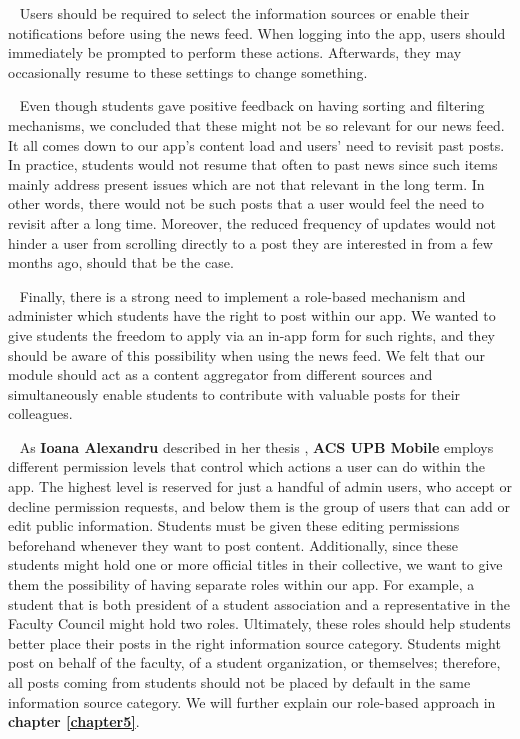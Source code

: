 ~
Users should be required to select the information sources or enable their notifications before using the news feed. When logging into the app, users should immediately be prompted to perform these actions. Afterwards, they may occasionally resume to these settings to change something.

~
Even though students gave positive feedback on having sorting and filtering mechanisms, we concluded that these might not be so relevant for our news feed. It all comes down to our app's content load and users' need to revisit past posts. In practice, students would not resume that often to past news since such items mainly address present issues which are not that relevant in the long term. In other words, there would not be such posts that a user would feel the need to revisit after a long time. Moreover, the reduced frequency of updates would not hinder a user from scrolling directly to a post they are interested in from a few months ago, should that be the case.

~
Finally, there is a strong need to implement a role-based mechanism and administer which students have the right to post within our app. We wanted to give students the freedom to apply via an in-app form for such rights, and they should be aware of this possibility when using the news feed. We felt that our module should act as a content aggregator from different sources and simultaneously enable students to contribute with valuable posts for their colleagues. 

~
As \textbf{Ioana Alexandru} described in her thesis \cite{ioana-alexandru-permission-levels}, \textbf{ACS UPB Mobile} employs different permission levels that control which actions a user can do within the app. The highest level is reserved for just a handful of admin users, who accept or decline permission requests, and below them is the group of users that can add or edit public information. Students must be given these editing permissions beforehand whenever they want to post content. Additionally, since these students might hold one or more official titles in their collective, we want to give them the possibility of having separate roles within our app. For example, a student that is both president of a student association and a representative in the Faculty Council might hold two roles. Ultimately, these roles should help students better place their posts in the right information source category. Students might post on behalf of the faculty, of a student organization, or themselves; therefore, all posts coming from students should not be placed by default in the same information source category. We will further explain our role-based approach in \textbf{chapter \ref{chapter5}}.

